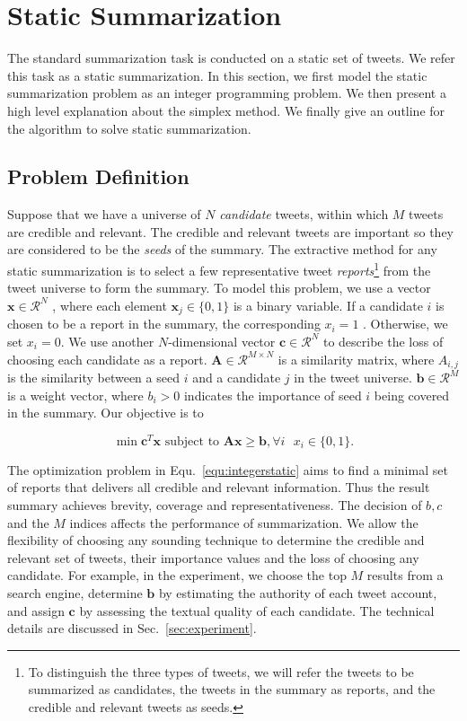 \documentclass[envcountsame]{llncs}
\begin{document}
\section{Static Summarization}\label{sec:static}
%
The standard summarization task is conducted on a static set of tweets. We refer this task as a static summarization. In this section, we first model the static summarization problem as an integer programming problem. We then present a high level explanation about the simplex method. We finally give an outline for the algorithm to solve static summarization.
\subsection{Problem Definition}
Suppose that we have a universe of $N$ \emph{candidate} tweets, within which $M$ tweets are credible and relevant. The credible and relevant tweets are important so they are considered to be the \emph{seeds} of the summary. The extractive method for any static summarization is to select a few representative tweet \emph{reports}\footnote{To distinguish the three types of tweets, we will refer the tweets to be summarized as candidates, the tweets in the summary as reports, and the credible and relevant tweets as seeds.} from the tweet universe to form the summary. To model this problem, we use a vector $\mathbf{x}\in \mathcal{R}^N$ , where each element $\mathbf{x}_j\in \{0,1\}$ is a binary variable. If a candidate  $i$ is chosen to be a report in the summary, the corresponding $x_i=1$ . Otherwise, we set  $x_i=0$. We use another $N$-dimensional vector $\mathbf{c}\in \mathcal{R}^N$ to describe the loss of choosing each candidate as a report. $\mathbf{A}\in\mathcal{R}^{M\times N}$  is a similarity matrix, where $A_{i,j}$  is the similarity between a seed $i$ and a candidate $j$ in the tweet universe. $\mathbf{b}\in \mathcal{R}^{M}$ is a weight vector, where $b_{i}>0$ indicates the importance of seed $i$ being covered in the summary. Our objective is to

\vspace{-0.3cm}
\begin{equation}\label{equ:integerstatic}
\min \mathbf{c}^T \mathbf{x} \textrm{ subject to } \mathbf{A} \mathbf{x} \geq \mathbf{b}, \forall i\textrm{ } x_i\in \{0,1\}.
\end{equation}
\vspace{-0.6cm}

The optimization problem in Equ.~\ref{equ:integerstatic} aims to find a minimal set of reports that delivers all credible and relevant information. Thus the result summary achieves brevity, coverage and representativeness. The decision of $b,c$ and the $M$ indices affects the performance of summarization. We allow the flexibility of choosing any sounding technique to determine the credible and relevant set of tweets, their importance values and the loss of choosing any candidate. For example, in the experiment,  we  choose the top $M$ results from a search engine, determine $\mathbf{b}$  by estimating  the authority of each tweet account, and assign $\mathbf{c}$ by assessing the textual quality of each candidate. The technical details are discussed in Sec.~\ref{sec:experiment}.
\end{document}
